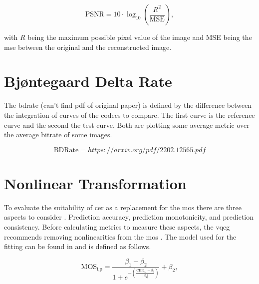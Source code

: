 \begin{equation}
    \text{PSNR} = 10 \cdot \log_{10} \left( \frac{R^2}{\text{MSE}} \right),
    \label{eq:psnr}
\end{equation}

with \(R\) being the maximum possible pixel value of the image and MSE being the \gls{mse} between the original and the reconstructed image.

\section{Bjøntegaard Delta Rate}
\label{subsec:bdrate}

The \gls{bdrate} \cite{bdrate_original_2001}\cite{bdrate_beyond_2022} (can't find pdf of original paper) is defined by the difference between the integration of curves of the codecs to compare.
The first curve is the reference curve and the second the test curve.
Both are plotting some average metric over the average bitrate of some images.

\begin{equation}
    \text{BDRate} = https://arxiv.org/pdf/2202.12565.pdf
    \label{eq:bdrate}
\end{equation}

\section{Nonlinear Transformation}
\label{sec:nonlinear}

To evaluate the suitability of \gls{cer} as a replacement for the \gls{mos} there are three aspects to consider \cite{nonlin_fit_original_2003}\cite{iqa_survey_2020}.
Prediction accuracy, prediction monotonicity, and prediction consistency.
Before calculating metrics to measure these aspects, the \gls{vqeg} recommends removing nonlinearities from the \gls{mos} \cite{nonlin_fit_original_2003}.
The model used for the fitting can be found in \cite{nonlin_fit_model_init_2000}\cite{nonlin_fit_appl_2017} and is defined as follows.

\begin{equation}
    \text{MOS}_{\text{i,p}} = \frac{\beta_{1}-\beta_{2}}{1 + e^{-\left(\frac{\text{CER}_{\text{c,i}}-\beta_{3}}{|\beta_{4}|}\right)}} + \beta_{2},
    \label{eq:nonlinear}
\end{equation}


